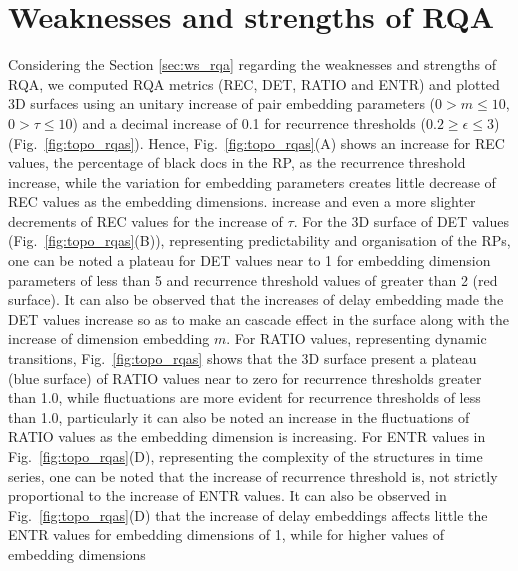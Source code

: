 %

\newpage
\section{Weaknesses and strengths of RQA}
Considering the Section \ref{sec:ws_rqa} regarding 
the weaknesses and strengths of RQA, we computed RQA metrics 
(REC, DET, RATIO and ENTR) and plotted 3D surfaces using an unitary 
increase of pair embedding parameters 
($0 > m \le 10$, $0 > \tau \le 10$) 
and a decimal increase of 0.1 for recurrence thresholds 
($ 0.2 \ge \epsilon \le 3 $) (Fig.~\ref{fig:topo_rqas}). 
Hence, Fig.~\ref{fig:topo_rqas}(A) shows an increase for 
REC values, the percentage of black docs in the RP, 
as the recurrence threshold increase,
while the variation for embedding parameters creates little decrease 
of REC values as the embedding dimensions.
 increase and even a more slighter 
decrements of REC values for the increase of $\tau$.
For the 3D surface of DET values (Fig.~\ref{fig:topo_rqas}(B)), 
representing 
predictability and organisation of the RPs, one can be noted a plateau
for DET values near to 1 for embedding dimension parameters of less 
than 5 and recurrence threshold values of greater than 2 (red surface). 
It can also be observed that the increases of delay embedding made 
the DET values increase so as to make an cascade effect in the surface 
along with the increase of dimension embedding $m$.
For RATIO values, representing dynamic transitions, 
Fig.~\ref{fig:topo_rqas} shows that the 3D surface present 
a plateau (blue surface) of RATIO values 
near to zero for recurrence thresholds greater than 1.0, while 
fluctuations are more evident for recurrence thresholds of less than 1.0,
particularly it can also be noted an increase in the fluctuations of 
RATIO values as the embedding dimension is increasing. 
For ENTR values in Fig.~\ref{fig:topo_rqas}(D), 
representing the complexity of the structures in time series, 
one can be noted that the increase of recurrence threshold is, 
not strictly proportional to the increase of ENTR values. 
It can also be observed in Fig.~\ref{fig:topo_rqas}(D)
that the increase of delay embeddings affects 
little the ENTR values for embedding dimensions of 1, while 
for higher values of embedding dimensions 
